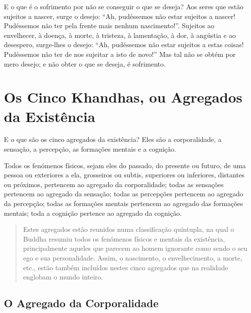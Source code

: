 E o que é o sofrimento por não se conseguir o que se deseja? Aos seres que estão
sujeitos a nascer, surge o desejo: ``Ah, pudéssemos não estar sujeitos a nascer!
Pudéssemos não ter pela frente mais nenhum nascimento!''. Sujeitos ao
envelhecer, à doença, à morte, à tristeza, à lamentação, à dor, à angústia e ao
desespero, surge-lhes o desejo: ``Ah, pudéssemos não estar sujeitos a estas
coisas! Pudéssemos não ter de nos sujeitar a isto de novo!'' Mas tal não se
obtém por mero desejo; e não obter o que se deseja, é sofrimento.


\clearpage

\section{Os Cinco Khandhas, ou Agregados da Existência}


E o que são os cinco agregados da existência? Eles são a corporalidade, a
sensação, a percepção, as formações mentais e a cognição.


Todos os fenómenos físicos, sejam eles do passado, do presente ou futuro, de uma
pessoa ou exteriores a ela, grosseiros ou subtis, superiores ou inferiores,
distantes ou próximos, pertencem ao agregado da corporalidade; todas as
sensações pertencem ao agregado da sensação; todas as percepções pertencem ao
agregado da percepção; todas as formações mentais pertencem ao agregado das
formações mentais; toda a cognição pertence ao agregado da cognição.


\begin{quote}
  Estes agregados estão reunidos numa classificação quíntupla, na qual o Buddha
  resumiu todos os fenómenos físicos e mentais da existência, principalmente
  aqueles que parecem ao homem ignorante como sendo o seu ego e sua
  personalidade. Assim, o nascimento, o envelhecimento, a morte, etc., estão
  também incluídos nestes cinco agregados que na realidade englobam o mundo
  inteiro.
\end{quote}

\clearpage

\subsection{O Agregado da Corporalidade}

